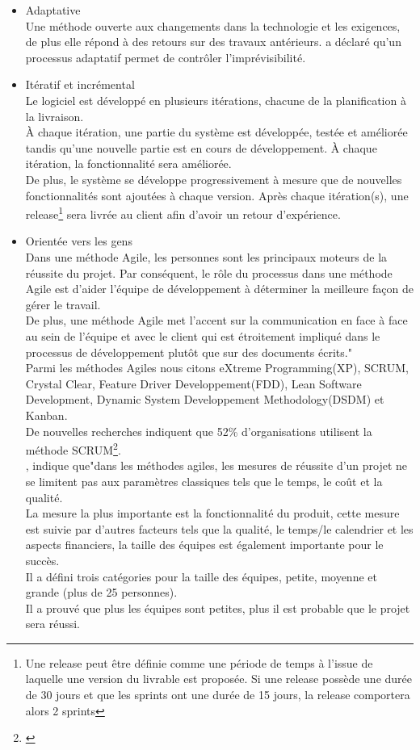\begin{itemize}
	\item Adaptative\\ Une méthode ouverte aux changements dans la technologie et les exigences, de plus elle répond à des retours sur des travaux antérieurs. \cite{fowler2008new} a déclaré qu'un processus adaptatif permet de contrôler l'imprévisibilité.
	\item Itératif et incrémental\\ Le logiciel est développé en plusieurs itérations, chacune de la planification à la livraison.\\
	À chaque itération, une partie du système est développée, testée et améliorée tandis qu'une nouvelle partie est en cours de développement. À chaque itération, la fonctionnalité sera améliorée.\\
	De plus, le système se développe progressivement à mesure que de nouvelles fonctionnalités sont ajoutées à chaque version.
	Après chaque itération(s), une release\footnote{Une release peut être définie comme une période de temps à l’issue de laquelle une version du livrable est proposée. Si une release possède une durée de 30 jours et que les sprints ont une durée de 15 jours, la release comportera alors 2 sprints } sera livrée au client afin d'avoir un retour d'expérience.
	\item Orientée vers les gens\\ 
	Dans une méthode Agile, les personnes sont les principaux moteurs de la réussite du projet.
	Par conséquent, le rôle du processus dans une méthode Agile est d'aider l'équipe de développement à déterminer la meilleure façon de gérer le travail.\\
	De plus, une méthode Agile met l'accent sur la communication en face à face au sein de l'équipe et avec le client qui est étroitement impliqué dans le processus de développement plutôt que sur des documents écrits."\\
	Parmi les méthodes Agiles nous citons eXtreme Programming(XP), SCRUM, Crystal Clear, Feature Driver Developpement(FDD), Lean Software Development, Dynamic System Developpement Methodology(DSDM) et Kanban.\\
	De nouvelles recherches indiquent que 52\% d'organisations utilisent la méthode SCRUM\footnote{\cite{sverrisdottir2014role}}.\\\cite{sverrisdottir2014role}, indique que"dans les méthodes agiles, les mesures de réussite d'un projet ne se limitent pas aux paramètres classiques tels que le temps, le coût et la qualité.\\ La mesure la plus importante est la fonctionnalité du produit, cette mesure est suivie par d'autres facteurs tels que la qualité, le temps/le calendrier et les aspects financiers, la taille des équipes est également importante pour le succès.\\ Il a défini trois catégories pour la taille des équipes, petite, moyenne et grande (plus de 25 personnes).\\
	Il a prouvé que plus les équipes sont petites, plus il est probable que le projet sera réussi.
	\newpage


\end{itemize}
